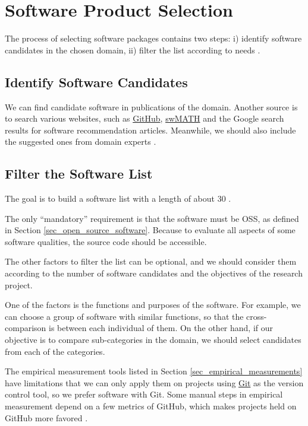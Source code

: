 \section{Software Product Selection}
\label{sec_software_selection}

The process of selecting software packages contains two steps: i) identify software candidates in the chosen domain, ii) filter the list according to needs \cite{SmithEtAl2021}.

\subsection{Identify Software Candidates}
\label{sec_identify_software_candidates}
We can find candidate software in publications of the domain. Another source is to search various websites, such as \hyperlink{https://github.com/}{GitHub}, \hyperlink{https://swmath.org/}{swMATH} and the Google search results for software recommendation articles. Meanwhile, we should also include the suggested ones from domain experts \cite{SmithEtAl2021}.

\subsection{Filter the Software List}
\label{sec_filter_software_list}
The goal is to build a software list with a length of about 30 \cite{SmithEtAl2021}.

The only ``mandatory'' requirement is that the software must be OSS, as defined in Section \ref{sec_open_source_software}. Because to evaluate all aspects of some software qualities, the source code should be accessible.

The other factors to filter the list can be optional, and we should consider them according to the number of software candidates and the objectives of the research project.

One of the factors is the functions and purposes of the software. For example, we can choose a group of software with similar functions, so that the cross-comparison is between each individual of them. On the other hand, if our objective is to compare sub-categories in the domain, we should select candidates from each of the categories.

The empirical measurement tools listed in Section \ref{sec_empirical_measurements} have limitations that we can only apply them on projects using \hyperlink{https://git-scm.com/}{Git} as the version control tool, so we prefer software with Git. Some manual steps in empirical measurement depend on a few metrics of GitHub, which makes projects held on GitHub more favored \cite{SmithEtAl2021}.

